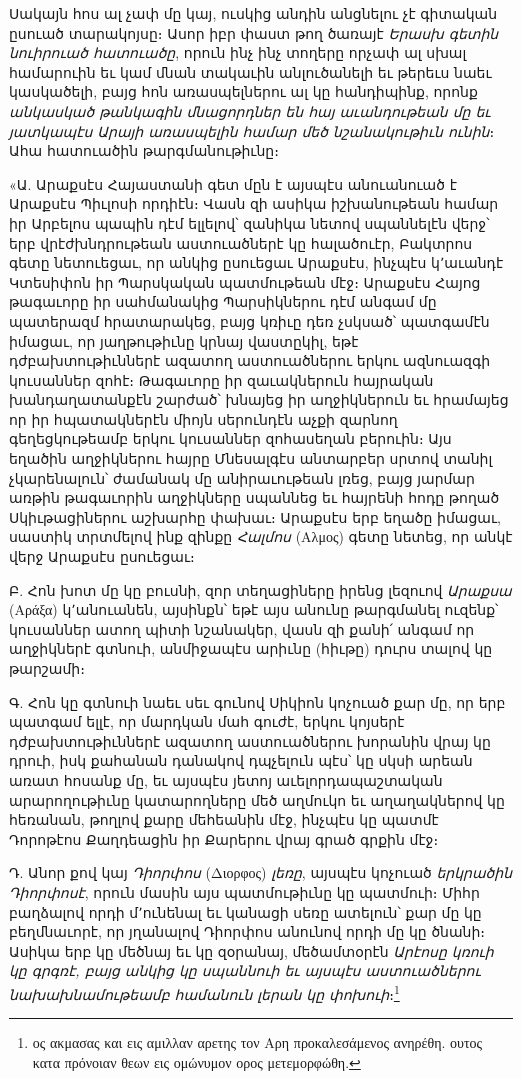 \documentclass{article}
\begin{document}
{Սակայն հոս ալ չափ մը կայ, ուսկից անդին անցնելու չէ գիտական ըսուած տարակոյսը։ Ասոր իբր փաստ թող ծառայէ \emph{Երասխ գետին նուիրուած հատուածը}, որուն ինչ ինչ տողերը որչափ ալ սխալ համարուին եւ կամ մնան տակաւին անլուծանելի եւ թերեւս նաեւ կասկածելի, բայց հոն առասպելներու ալ կը հանդիպինք, որոնք \emph{անկասկած թանկագին մնացորդներ են հայ աւանդութեան մը եւ յատկապէս Արայի առասպելին համար մեծ նշանակութիւն ունին}։ Ահա հատուածին թարգմանութիւնը։

«Ա. Արաքսէս Հայաստանի գետ մըն է այսպէս անուանուած է Արաքսէս Պիւլոսի որդիէն։ Վասն զի ասիկա իշխանութեան համար իր Արբելոս պապին դէմ ելլելով՝ զանիկա նետով սպաննելէն վերջ՝ երբ վրէժխնդրութեան աստուածներէ կը հալածուէր, Բակտրոս գետը նետուեցաւ, որ անկից ըսուեցաւ Արաքսէս, ինչպէս կ՚աւանդէ Կտեսիփոն իր Պարսկական պատմութեան մէջ։ Արաքսէս Հայոց թագաւորը իր սահմանակից Պարսիկներու դէմ անգամ մը պատերազմ հրատարակեց, բայց կռիւը դեռ չսկսած՝ պատգամէն իմացաւ, որ յաղթութիւնը կրնայ վաստըկիլ, եթէ դժբախտութիւններէ ազատող աստուածներու երկու ազնուազգի կուսաններ զոհէ։ Թագաւորը իր զաւակներուն հայրական խանդաղատանքէն շարժած՝ խնայեց իր աղջիկներուն եւ հրամայեց որ իր հպատակներէն միոյն սերունդէն աչքի զարնող գեղեցկութեամբ երկու կուսաններ զոհասեղան բերուին։ Այս եղածին աղջիկներու հայրը Մնեսալգէս անտարբեր սրտով տանիլ չկարենալուն՝ ժամանակ մը անիրաւութեան լռեց, բայց յարմար առթին թագաւորին աղջիկները սպաննեց եւ հայրենի հոդը թողած Սկիւթացիներու աշխարհը փախաւ։ Արաքսէս երբ եղածը իմացաւ, սաստիկ տրտմելով ինք զինքը \emph{Հալմոս} (Αλμος) գետը նետեց, որ անկէ վերջ Արաքսէս ըսուեցաւ։

Բ. Հոն խոտ մը կը բուսնի, զոր տեղացիները իրենց լեզուով \emph{Արաքսա} (Αράξα) կ՚անուանեն, այսինքն՝ եթէ այս անունը թարգմանել ուզենք՝ կուսաններ ատող պիտի նշանակեր, վասն զի քանի՛ անգամ որ աղջիկներէ գտնուի, անմիջապէս արիւնը (հիւթը) դուրս տալով կը թարշամի։

Գ. Հոն կը գտնուի նաեւ սեւ գունով Սիկիոն կոչուած քար մը, որ երբ պատգամ ելլէ, որ մարդկան մահ գուժէ, երկու կոյսերէ դժբախտութիւններէ ազատող աստուածներու խորանին վրայ կը դրուի, իսկ քահանան դանակով դպչելուն պէս՝ կը սկսի արեան առատ հոսանք մը, եւ այսպէս յետոյ աւելորդապաշտական արարողութիւնը կատարողները մեծ աղմուկո եւ աղաղակներով կը հեռանան, թողլով քարը մեհեանին մէջ, ինչպէս կը պատմէ Դորոթէոս Քաղդեացին իր Քարերու վրայ գրած գրքին մէջ։

Դ. Անոր քով կայ \emph{Դիորփոս} (Διορφος) \emph{լեռը}, այսպէս կոչուած \emph{երկրածին Դիորփոսէ}, որուն մասին այս պատմութիւնը կը պատմուի։ Միհր բաղձալով որդի մ՚ունենալ եւ կանացի սեռը ատելուն՝ քար մը կը բեղմնաւորէ, որ յղանալով Դիորփոս անունով որդի մը կը ծնանի։ Ասիկա երբ կը մեծնայ եւ կը զօրանայ, մեծամտօրէն \emph{Արէոսը կռուի կը գրգռէ, բայց անկից կը սպաննուի եւ այսպէս աստուածներու նախախնամութեամբ համանուն լերան կը փոխուի}։\footnote{ος ακμασας και εις αμιλλαν αρετης τον Αρη προκαλεσάμενος ανηρέθη. ουτος κατα πρόνοιαν θεων εις ομώνυμον ορος μετεμορφώθη.}

}
\end{document}
